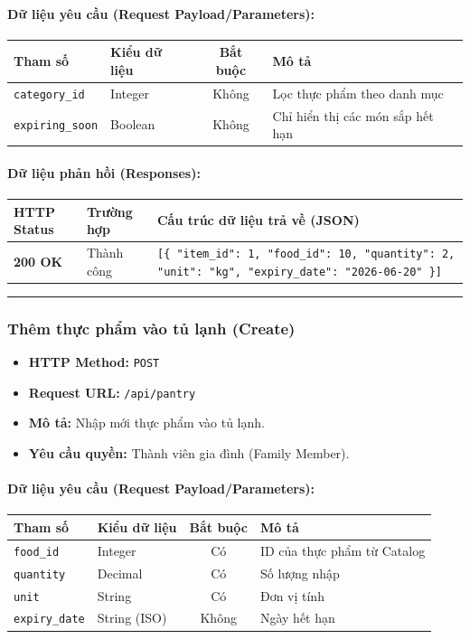 \documentclass[12pt,a4paper]{article}
\begin{document}
\paragraph{Dữ liệu yêu cầu (Request Payload/Parameters):}
\begin{longtable}{|p{2.8cm}|p{2.2cm}|c|p{7.0cm}|}
\hline
\textbf{Tham số} & \textbf{Kiểu dữ liệu} & \textbf{Bắt buộc} & \textbf{Mô tả} \\ \hline
\endhead
\texttt{category\_id} & Integer & Không & Lọc thực phẩm theo danh mục \\ \hline
\texttt{expiring\_soon} & Boolean & Không & Chỉ hiển thị các món sắp hết hạn \\ \hline
\end{longtable}

\paragraph{Dữ liệu phản hồi (Responses):}
\begin{longtable}{|p{2.8cm}|p{3.2cm}|p{8.0cm}|}
\hline
\textbf{HTTP Status} & \textbf{Trường hợp} & \textbf{Cấu trúc dữ liệu trả về (JSON)} \\ \hline
\endhead
\textbf{200 OK} & Thành công & \texttt{[\{ "item\_id": 1, "food\_id": 10, "quantity": 2, "unit": "kg", "expiry\_date": "2026-06-20" \}]} \\ \hline
\end{longtable}

\vskip 0.4cm
\noindent\rule{\textwidth}{0.3pt}
\vskip 0.4cm

\subsubsection{Thêm thực phẩm vào tủ lạnh (Create)}
\begin{itemize}[leftmargin=*]
    \item \textbf{HTTP Method:} \texttt{POST}
    \item \textbf{Request URL:} \texttt{/api/pantry}
    \item \textbf{Mô tả:} Nhập mới thực phẩm vào tủ lạnh.
    \item \textbf{Yêu cầu quyền:} Thành viên gia đình (Family Member).
\end{itemize}

\paragraph{Dữ liệu yêu cầu (Request Payload/Parameters):}
\begin{longtable}{|p{2.8cm}|p{2.2cm}|c|p{7.0cm}|}
\hline
\textbf{Tham số} & \textbf{Kiểu dữ liệu} & \textbf{Bắt buộc} & \textbf{Mô tả} \\ \hline
\endhead
\texttt{food\_id} & Integer & Có & ID của thực phẩm từ Catalog \\ \hline
\texttt{quantity} & Decimal & Có & Số lượng nhập \\ \hline
\texttt{unit} & String & Có & Đơn vị tính \\ \hline
\texttt{expiry\_date} & String (ISO) & Không & Ngày hết hạn \\ \hline
\end{longtable}
\end{document}
